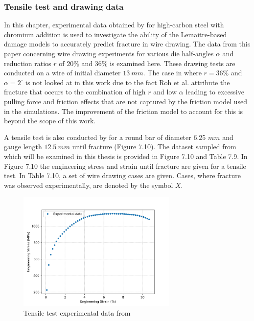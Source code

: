 \documentclass[sn-mathphys,Numbered,draft]{sn-jnl}%
\begin{document}
\subsubsection{Tensile test and drawing data}

In this chapter, experimental data obtained by \citet{roh_process_2021} for high-carbon steel with chromium addition is used to investigate the ability of the Lemaitre-based damage models to accurately predict fracture in wire drawing. The data from this paper concerning wire drawing experiments for various die half-angles $\alpha$ and reduction ratios $r$ of $20\%$ and $36\%$ is examined here. These drawing tests are conducted on a wire of initial diameter $13\ mm$. The case in \citet{roh_process_2021} where $r=36\%$ and $\alpha=2^{\circ}$ is not looked at in this work due to the fact Roh et al. attribute the fracture that occurs to the combination of high $r$ and low $\alpha$ leading to excessive pulling force and friction effects that are not captured by the friction model used in the simulations. The improvement of the friction model to account for this is beyond the scope of this work.  

A tensile test is also conducted by \citet{roh_process_2021} for a round bar of diameter 6.25 $mm$ and gauge length $12.5\ mm$ until fracture (Figure 7.10). The dataset sampled from \citet{roh_process_2021} which will be examined in this thesis is provided in Figure 7.10 and Table 7.9. In Figure 7.10 the engineering stress and strain until fracture are given for a tensile test. In Table 7.10, a set of wire drawing cases are given. Cases, where fracture was observed experimentally, are denoted by the symbol $X$.


\begin{figure}[htb]
\begin{center}
	\includegraphics[width=0.7\textwidth]{./Figures/SimulationAndAnalysis/compareExperimentalSimulation/experimentalData.png}
\caption{Tensile test experimental data from \cite{roh_process_2021}}
\label{fig:notchedRoundBAr}
\end{center}
\end{figure}
\end{document}
